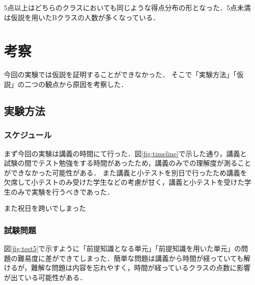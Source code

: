 \documentclass[a4j,12pt]{jsarticle}
\begin{document}
\begin{table}[H]
\centering
{}
\caption{小テスト全体の平均点の比較}
\label{fig:12ank}
\end{table}

5点以上はどちらのクラスにおいても同じような得点分布の形となった．5点未満は仮説を用いたBクラスの人数が多くなっている．
 


\newpage
\section{考察}
今回の実験では仮説を証明することができなかった．
そこで「実験方法」「仮説」の二つの観点から原因を考察した．

\subsection{実験方法}
\subsubsection{スケジュール}
まず今回の実験は講義の時間にて行った．図\ref{fig:timeline}で示した通り，講義と試験の間でテスト勉強をする時間があったため，講義のみでの理解度が測ることができなかった可能性がある．
また講義と小テストを別日で行ったため講義を欠席して小テストのみ受けた学生などの考慮が甘く，講義と小テストを受けた学生のみで実験を行うべきであった．

また祝日を跨いでしまった

\subsubsection{試験問題}

図\ref{fig:test5}で示すように「前提知識となる単元」「前提知識を用いた単元」の問題の難易度に差ができてしまった．簡単な問題は講義から時間が経っていても解けるが，難解な問題は内容を忘れやすく，時間が経っているクラスの点数に影響が出ている可能性がある．
\end{document}
